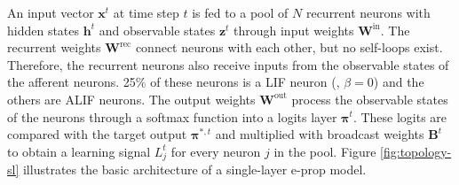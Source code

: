         An input vector $\mathbf{x}^t$ at time step $t$ is fed to a pool of $N$ recurrent neurons with hidden states $\mathbf{h}^t$ and observable states $\mathbf{z}^t$ through input weights $\mathbf{W}^\text{in}$.
        The recurrent weights $\mathbf{W}^\text{rec}$ connect neurons with each other, but no self-loops exist.
        Therefore, the recurrent neurons also receive inputs from the observable states of the afferent neurons.
        25\% of these neurons is a LIF neuron (\ie, $\beta = 0$) and the others are ALIF neurons.
        The output weights $\mathbf{W}^\text{out}$ process the observable states of the neurons through a softmax function into a logits layer $\mathbf{\pi}^t$.
        These logits are compared with the target output $\mathbf{\pi}^{*, t}$ and multiplied with broadcast weights $\mathbf{B}^t$ to obtain a learning signal $L_j^t$ for every neuron $j$ in the pool.
        Figure \ref{fig:topology-sl} illustrates the basic architecture of a single-layer e-prop model.
